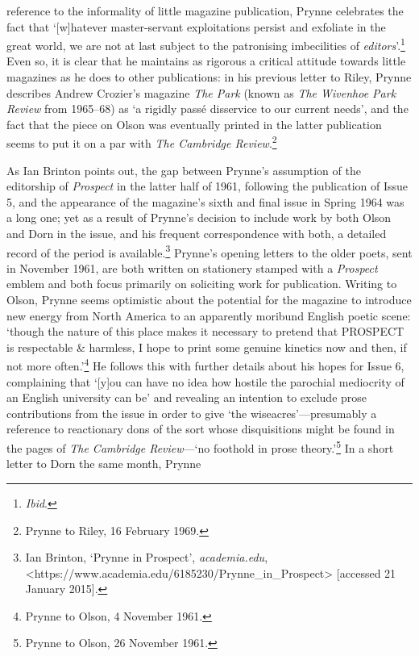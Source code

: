 \documentclass[]{article}
\begin{document}
reference to the informality of little magazine publication, Prynne
celebrates the fact that ‘{[}w{]}hatever master-servant exploitations
persist and exfoliate in the great world, we are not at last subject to
the patronising imbecilities of \emph{editors}’.\footnote{\emph{Ibid}.}
Even so, it is clear that he maintains as rigorous a critical attitude
towards little magazines as he does to other publications: in his
previous letter to Riley, Prynne describes Andrew Crozier’s magazine
\emph{The Park} (known as \emph{The Wivenhoe Park Review} from 1965–68)
as ‘a rigidly passé disservice to our current needs’, and the fact that
the piece on Olson was eventually printed in the latter publication
seems to put it on a par with \emph{The Cambridge Review}.\footnote{Prynne
  to Riley, 16 February 1969.}

As Ian Brinton points out, the gap between Prynne’s assumption of the
editorship of \emph{Prospect} in the latter half of 1961, following the
publication of Issue 5, and the appearance of the magazine’s sixth and
final issue in Spring 1964 was a long one; yet as a result of Prynne’s
decision to include work by both Olson and Dorn in the issue, and his
frequent correspondence with both, a detailed record of the period is
available.\footnote{Ian Brinton, ‘Prynne in Prospect’,
  \emph{academia.edu},
  \textless{}https://www.academia.edu/6185230/Prynne\_in\_Prospect\textgreater{}
  {[}accessed 21 January 2015{]}.} Prynne’s opening letters to the older
poets, sent in November 1961, are both written on stationery stamped
with a \emph{Prospect} emblem and both focus primarily on soliciting
work for publication. Writing to Olson, Prynne seems optimistic about
the potential for the magazine to introduce new energy from North
America to an apparently moribund English poetic scene: ‘though the
nature of this place makes it necessary to pretend that PROSPECT is
respectable \& harmless, I hope to print some genuine kinetics now and
then, if not more often.’\footnote{Prynne to Olson, 4 November 1961.} He
follows this with further details about his hopes for Issue 6,
complaining that ‘{[}y{]}ou can have no idea how hostile the parochial
mediocrity of an English university can be’ and revealing an intention
to exclude prose contributions from the issue in order to give ‘the
wiseacres’—presumably a reference to reactionary dons of the sort whose
disquisitions might be found in the pages of \emph{The Cambridge
Review}—‘no foothold in prose theory.’\footnote{Prynne to Olson, 26
  November 1961.} In a short letter to Dorn the same month, Prynne
\end{document}
